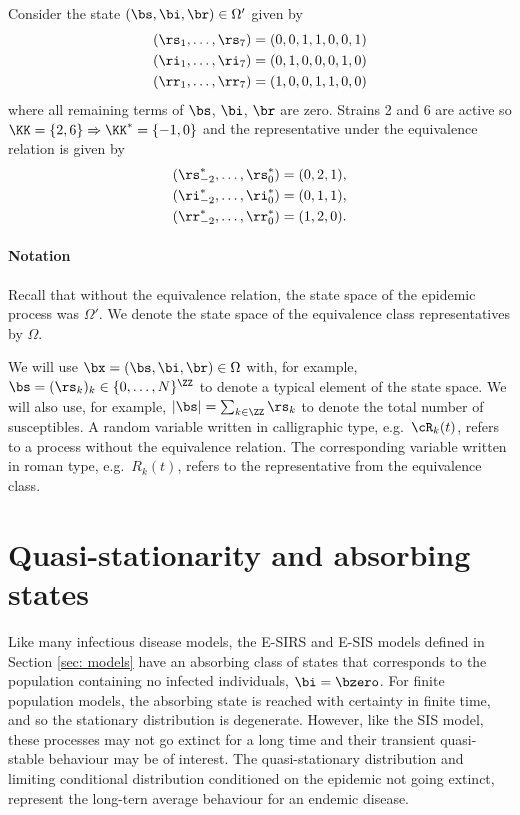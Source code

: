 \documentclass[smallextended]{svjour3}       %
\begin{document}
\begin{example}
	Consider the state $(\bs, \bi, \br) \in \Omega'$ 
	given by
	\begin{align*}
		(\rs_1, \dots, \rs_7) &= (0,0,1,1,0,0,1) \\
		(\ri_1, \dots, \ri_7) &= (0,1,0,0,0,1,0) \\
		(\rr_1, \dots, \rr_7) &= (1,0,0,1,1,0,0)
	\end{align*}
	where all remaining terms of $\bs$, $\bi$, $\br$ are zero. Strains 2 and 6 are active so $\KK = \{2, 6\} \Rightarrow \KK^* = \{-1,0\}$
	and the representative under the equivalence relation is
	given by
	\begin{align*}
		(\rs^*_{-2}, \dots, \rs^*_0) &= (0,2,1), \\
		(\ri^*_{-2}, \dots, \ri^*_0) &= (0,1,1), \\
		(\rr^*_{-2}, \dots, \rr^*_0) &= (1,2,0).
	\end{align*}
\end{example}


\paragraph{Notation}\label{para: notation}
Recall that without the equivalence relation, the state space of the epidemic process was $\Omega'$. We denote the state space of the equivalence class representatives by $\Omega$. 

We will use $\bx = (\bs, \bi, \br) \in \Omega$ with, for example, $\bs = (\rs_k)_k \in \{0,\dots,N\}^{\ZZ}$ to denote a typical element of the state space. We will also use, for example, $|\bs| = \sum_{k \in \ZZ} \rs_k$ to denote the total number of susceptibles. A random variable written in calligraphic type, e.g.\ $\cR_k(t)$, refers to a process without the equivalence relation. The corresponding variable written in roman type, e.g.\ $R_k(t)$, refers to the representative from the equivalence class.

\section{Quasi-stationarity and absorbing states}\label{sec: qsd evo}

Like many infectious disease models, the E-SIRS and E-SIS models defined in Section \ref{sec: models} have an absorbing class of states that corresponds to the population containing no infected individuals, $\bi=\bzero$. For finite population models, the absorbing state is reached with certainty in finite time, and so the stationary distribution is degenerate. However, like the SIS model, these processes may not go extinct for a long time and their transient quasi-stable behaviour may be of interest. The quasi-stationary distribution and limiting conditional distribution conditioned on the epidemic not going extinct, represent the long-tern average behaviour for an endemic disease. 
\end{document}
